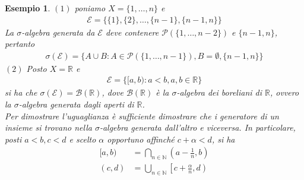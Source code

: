\documentclass[oneside, 11pt]{amsbook}
\newcommand{\0}{{(0)}}
\newcommand{\3}{{(3)}}
\theoremstyle{colonplain}
\theoremstyle{colondefinition}
\newtheorem{ex}[thm]{Esempio}
\theoremstyle{colonremark}
\numberwithin{equation}{chapter}
\begin{document}
\begin{ex}
$(1)$ poniamo $X = \{1, \dots, n\}$ e
\begin{align}
    \mathcal{E} = \{\{1\}, \{2\}, \dots, \{n - 1\}, \{n - 1, n\}\}
\end{align}
La $\sigma$-algebra generata da $\mathcal{E}$ deve contenere $\mathcal{P}(\{1, \dots, n - 2\})$ e $\{n - 1, n\}$, pertanto
\begin{align}
    \sigma(\mathcal{E}) = \{A \cup B : A \in \mathcal{P}(\{1, \dots, n - 1\}), B = \emptyset, \{n - 1, n\}\}
\end{align}
$(2)$ Posto $X = \mathbb{R}$ e
\begin{align}
    \mathcal{E} = \{[a, b) : a < b, a, b \in \mathbb{R}\}
\end{align}
si ha che $\sigma(\mathcal{E}) = \mathcal{B}(\mathbb{R})$, dove $\mathcal{B}(\mathbb{R})$ è la $\sigma$-algebra dei \textit{boreliani} di $\mathbb{R}$, ovvero la $\sigma$-algebra generata dagli aperti di $\mathbb{R}$. \\
Per dimostrare l'uguaglianza è sufficiente dimostrare che i generatore di un insieme si trovano nella $\sigma$-algebra generata dall'altro e viceversa. In particolare, posti $a < b, c < d$ e scelto $\alpha$ opportuno affinché $c + \alpha < d$, si ha
\begin{align}
    [a, b) &= \bigcap_{n \in \mathbb{N}} \left(a - \frac{1}{n}, b\right) \\
    (c, d) &= \bigcup_{n \in \mathbb{N}} \left[c + \frac{\alpha}{n}, d\right)
\end{align}
\end{ex}
\end{document}
